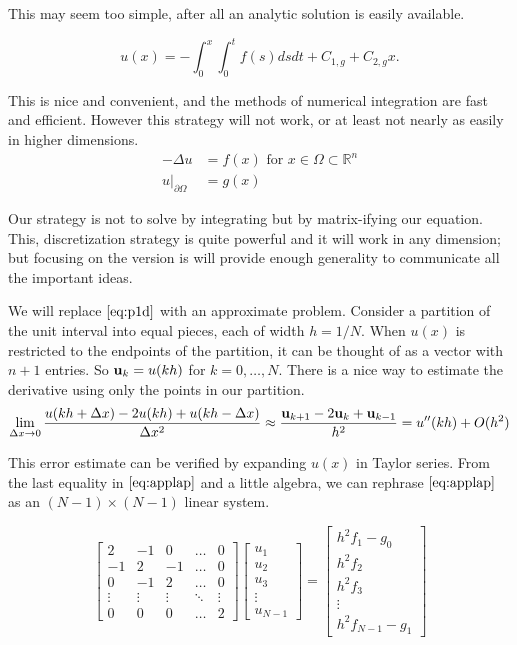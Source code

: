 \documentclass{article}
\newcommand{\bu}{{\bf u}}
\newcommand{\beq}{\begin{equation}}
\newcommand{\eeq}{\end{equation}}
\theoremstyle{remark}
\begin{document}
This may seem too simple, after all an analytic solution is easily available. 

\beq
u(x) = -\int_0^x \int_0^t f(s)dsdt + C_{1,g} + C_{2,g}x.
\eeq

This is nice and convenient, and the methods of numerical integration are fast and efficient. However this strategy will not work, or at least not nearly as easily in higher dimensions.
\begin{align}
\label{eq:pnd}
-\Delta u &= f(x) \text{ for } x\in \Omega \subset \mathbb{R}^n\\ \nonumber
u|_{\partial \Omega} &= g(x)
\end{align}

Our strategy is not to solve by integrating but by matrix-ifying our equation. This, discretization strategy is quite powerful and it will work in any dimension; but focusing on the  version is will provide enough generality to communicate all the important ideas. 

We will replace $\eqref{eq:p1d}$ with an approximate problem. Consider a partition of the unit interval into equal pieces, each of width $h= 1/N$. When $u(x)$ is restricted to the endpoints  of the partition, it can be thought of as a vector with $n+1$ entries. So $\bu_k = u(kh)$ for $k = 0, \dots, N$. There is a nice way to estimate the derivative using only the points in our partition.  
\beq
\label{eq:applap}
\lim_{\Delta x \to 0} \frac{u(kh+\Delta x) -2u(kh) + u(kh-\Delta x)}{\Delta x^2}\approx \frac{\bu_{k+1} - 2\bu_k + \bu_{k-1}}{h^2} = u''(kh) + O(h^2)
\eeq

This error estimate can be verified by expanding $u(x)$ in Taylor series. From the last equality in $\eqref{eq:applap}$ and a little algebra, we can rephrase $\eqref{eq:applap}$ as an $(N-1)\times(N-1)$ linear system. 

\beq
\label{eq:A}
\begin{bmatrix}
2 & -1 & 0 & \dots & 0   \\
-1  & 2 & -1 & \dots & 0  \\
0  & -1 & 2 & \dots & 0 \\
\vdots & \vdots & \vdots & \ddots & \vdots \\
0 & 0 & 0 & \dots & 2
\end{bmatrix}
 \begin{bmatrix}
u_1\\ 
u_2\\
u_3\\
\vdots\\
u_{N-1}
\end{bmatrix}
= 
\begin{bmatrix}
h^2f_1 - g_0\\
h^2f_2 \\
h^2f_3 \\
\vdots\\
h^2f_{N-1} - g_1
\end{bmatrix}
\eeq
\end{document}
